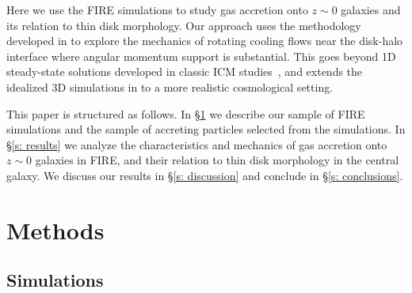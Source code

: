 \documentclass[fleqn,usenatbib]{mnras}
\begin{document}
Here we use the FIRE simulations to study gas accretion onto $z\sim0$ galaxies and its relation to thin disk morphology. Our approach uses the methodology developed in \citet{Hafen2019,Hafen2020} to 
explore the mechanics of rotating cooling flows near the disk-halo interface where angular momentum support is substantial.  This goes beyond 1D steady-state solutions developed in classic ICM studies~\citep[e.g.][]{Cowie1980}, and extends the idealized 3D simulations in \cite{Stern2019} to a more realistic cosmological setting. 

This paper is structured as follows. 
In \S\ref{s: methods} we describe our sample of FIRE simulations and the sample of accreting particles selected from the simulations.
In \S\ref{s: results} we analyze the characteristics and mechanics of gas accretion onto $z\sim0$ galaxies in FIRE, and their relation to thin disk morphology in the central galaxy.
We discuss our results in \S\ref{s: discussion} and conclude in \S\ref{s: conclusions}.

\section{Methods}
\label{s: methods}

\subsection{Simulations}
\label{s: methods -- simulations}
\end{document}
